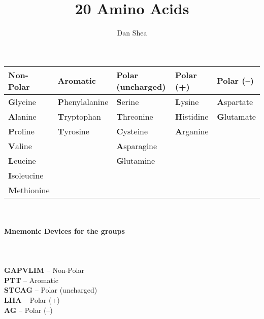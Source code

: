 \documentclass[10pt, letterpaper]{paper}
\title{20 Amino Acids}
\author{Dan Shea}
\begin{document}
{
\centering
\begin{tabular}{|l|l|l|l|l|}
\hline
\textbf{Non-Polar} & \textbf{Aromatic} & \textbf{Polar (uncharged)} & \textbf{Polar (+)}& \textbf{Polar (--)}\\
\hline
\textbf{G}lycine & \textbf{P}henylalanine & \textbf{S}erine & \textbf{L}ysine & \textbf{A}spartate\\
\textbf{A}lanine & \textbf{T}ryptophan & \textbf{T}hreonine & \textbf{H}istidine & \textbf{G}lutamate\\
\textbf{P}roline & \textbf{T}yrosine & \textbf{C}ysteine & \textbf{A}rganine &\\
\textbf{V}aline & & \textbf{A}sparagine & &\\
\textbf{L}eucine & & \textbf{G}lutamine & &\\
\textbf{I}soleucine & & & & \\
\textbf{M}ethionine & & & & \\
\hline
\end{tabular}
\\}
\paragraph{Mnemonic Devices for the groups} ~\\
~\\
\textbf{GAPVLIM} -- Non-Polar\\
\textbf{PTT} -- Aromatic\\
\textbf{STCAG} -- Polar (uncharged)\\
\textbf{LHA} -- Polar (+)\\
\textbf{AG} -- Polar (--)
\end{document}
